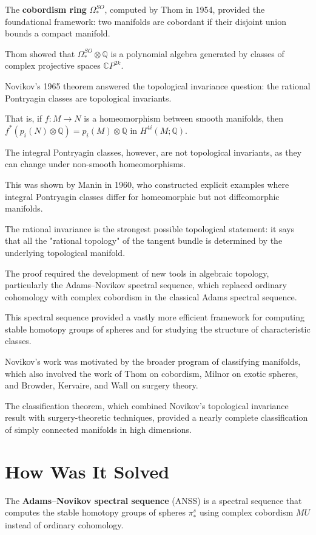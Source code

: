 The \textbf{cobordism ring} $\Omega_*^{SO}$, computed by Thom in 1954, provided the foundational framework: two manifolds are cobordant if their disjoint union bounds a compact manifold.

Thom showed that $\Omega_*^{SO} \otimes \mathbb{Q}$ is a polynomial algebra generated by classes of complex projective spaces $\mathbb{C}P^{2k}$.

Novikov's 1965 theorem answered the topological invariance question: the rational Pontryagin classes are topological invariants.

That is, if $f: M \to N$ is a homeomorphism between smooth manifolds, then $f^*(p_i(N) \otimes \mathbb{Q}) = p_i(M) \otimes \mathbb{Q}$ in $H^{4i}(M; \mathbb{Q})$.

The integral Pontryagin classes, however, are not topological invariants, as they can change under non-smooth homeomorphisms.

This was shown by Manin in 1960, who constructed explicit examples where integral Pontryagin classes differ for homeomorphic but not diffeomorphic manifolds.

The rational invariance is the strongest possible topological statement: it says that all the "rational topology" of the tangent bundle is determined by the underlying topological manifold.

The proof required the development of new tools in algebraic topology, particularly the Adams--Novikov spectral sequence, which replaced ordinary cohomology with complex cobordism in the classical Adams spectral sequence.

This spectral sequence provided a vastly more efficient framework for computing stable homotopy groups of spheres and for studying the structure of characteristic classes.

Novikov's work was motivated by the broader program of classifying manifolds, which also involved the work of Thom on cobordism, Milnor on exotic spheres, and Browder, Kervaire, and Wall on surgery theory.

The classification theorem, which combined Novikov's topological invariance result with surgery-theoretic techniques, provided a nearly complete classification of simply connected manifolds in high dimensions.

\section{How Was It Solved}

The \textbf{Adams--Novikov spectral sequence} (ANSS) is a spectral sequence that computes the stable homotopy groups of spheres $\pi_*^s$ using complex cobordism $MU$ instead of ordinary cohomology.

